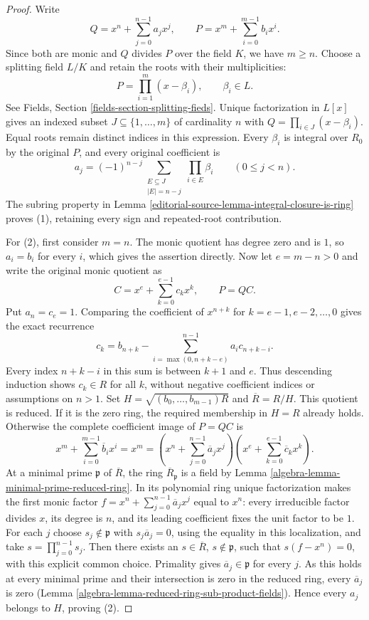 \begin{proof}
Write
$$
Q=x^n+\sum_{j=0}^{n-1}a_jx^j,\qquad
P=x^m+\sum_{i=0}^{m-1}b_ix^i.
$$
Since both are monic and $Q$ divides $P$ over the field $K$,
we have $m\geq n$. Choose a splitting field $L/K$ and retain
the roots with their multiplicities:
$$
P=\prod_{i=1}^m(x-\beta_i),\qquad \beta_i\in L.
$$
See Fields, Section \ref{fields-section-splitting-fieds}.
Unique factorization in $L[x]$ gives an indexed subset
$J\subseteq\{1,\ldots,m\}$ of cardinality $n$ with
$Q=\prod_{i\in J}(x-\beta_i)$. Equal roots remain distinct
indices in this expression. Every $\beta_i$ is integral over
$R_0$ by the original $P$, and every original coefficient is
$$
a_j=(-1)^{n-j}
\sum_{\substack{E\subseteq J\\ |E|=n-j}}
\prod_{i\in E}\beta_i\qquad(0\leq j<n).
$$
The subring property in Lemma \ref{editorial-source-lemma-integral-closure-is-ring}
proves (1), retaining every sign and repeated-root contribution.

For (2), first consider $m=n$. The monic quotient has degree
zero and is $1$, so $a_i=b_i$ for every $i$, which gives the
assertion directly. Now let $e=m-n>0$ and write the original
monic quotient as
$$
C=x^e+\sum_{k=0}^{e-1}c_kx^k,\qquad P=QC.
$$
Put $a_n=c_e=1$. Comparing the coefficient of $x^{n+k}$
for $k=e-1,e-2,\ldots,0$ gives the exact recurrence
$$
c_k=b_{n+k}-
\sum_{i=\max(0,n+k-e)}^{n-1}a_i c_{n+k-i}.
$$
Every index $n+k-i$ in this sum is between $k+1$ and $e$.
Thus descending induction shows $c_k\in R$ for all $k$,
without negative coefficient indices or assumptions on $n>1$.
Set $H=\sqrt{(b_0,\ldots,b_{m-1})R}$ and
$\overline R=R/H$. This quotient is reduced. If it is the
zero ring, the required membership in $H=R$ already holds.
Otherwise the complete coefficient image of $P=QC$ is
$$
x^m+\sum_{i=0}^{m-1}\overline b_i x^i=x^m
=\left(x^n+\sum_{j=0}^{n-1}\overline a_jx^j\right)
 \left(x^e+\sum_{k=0}^{e-1}\overline c_kx^k\right).
$$
At a minimal prime $\mathfrak p$ of $\overline R$, the ring
$\overline R_{\mathfrak p}$ is a field by
Lemma \ref{algebra-lemma-minimal-prime-reduced-ring}. In its polynomial
ring unique factorization makes the first monic factor
$f=x^n+\sum_{j=0}^{n-1}\overline a_jx^j$ equal to $x^n$:
every irreducible factor divides $x$, its degree is $n$, and
its leading coefficient fixes the unit factor to be $1$.
For each $j$ choose $s_j\notin\mathfrak p$ with
$s_j\overline a_j=0$, using the equality in this localization,
and take $s=\prod_{j=0}^{n-1}s_j$.
Then there exists an $s\in\overline R$, $s\notin\mathfrak p$,
such that $s(f-x^n)=0$, with this explicit common choice.
Primality gives $\overline a_j\in\mathfrak p$ for every $j$.
As this holds at every minimal prime and their intersection
is zero in the reduced ring, every $\overline a_j$ is zero
(Lemma \ref{algebra-lemma-reduced-ring-sub-product-fields}).
Hence every $a_j$ belongs to $H$, proving (2).
\end{proof}


